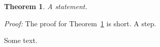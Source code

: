 \documentclass{article}
\newtheorem{theorem}{Theorem}
\newcommand{\off}[1]{}
\begin{document}
\begin{theorem}\label{th:a}
A statement.
\end{theorem}
\off{\textit{Proof(Rate)}: An old argument with $x_{a,b}$ and \qed}

{\em Proof:} The proof for Theorem~\ref{th:a} is short. A step.

Some text.
\end{document}
